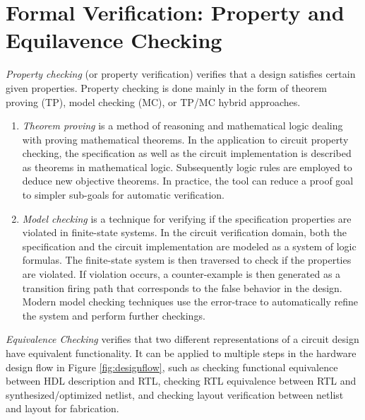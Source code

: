 \section{Formal Verification: Property and Equilavence Checking}


{\it Property checking} (or property verification) verifies
that a design satisfies certain given properties. Property checking is done mainly 
in the form of theorem proving (TP), model checking (MC), or TP/MC hybrid approaches.
\begin{enumerate}[{1)}]
\item \emph{Theorem proving} \cite{theoremproving:91} 
is a method of reasoning and mathematical logic dealing with proving 
mathematical theorems. In the application to circuit property checking, 
the specification as well as the circuit implementation
is described as theorems in mathematical logic. Subsequently logic rules
are employed to deduce new objective theorems. In practice, the tool can reduce
a proof goal to simpler sub-goals for automatic verification.

\item \emph{Model checking} \cite{modelcheck:99} is a technique 
for verifying if the specification properties are violated in finite-state systems. In the circuit verification 
domain, both the specification and the circuit implementation are modeled as a system of 
logic formulas. The finite-state system is then traversed to check if the 
properties are violated. If violation occurs, 
a counter-example is then generated as a transition firing path that corresponds to the
false behavior in the design. 
Modern model checking techniques use the error-trace to automatically refine
the system and perform further checkings.
\end{enumerate}

{\it Equivalence Checking} verifies that two different representations of
a circuit design have equivalent functionality. It can be applied to 
multiple steps in the hardware design flow in Figure \ref{fig:designflow},
such as checking functional equivalence between HDL description and RTL,
checking RTL equivalence between RTL and synthesized/optimized netlist, 
and checking layout verification between netlist and layout for fabrication.

